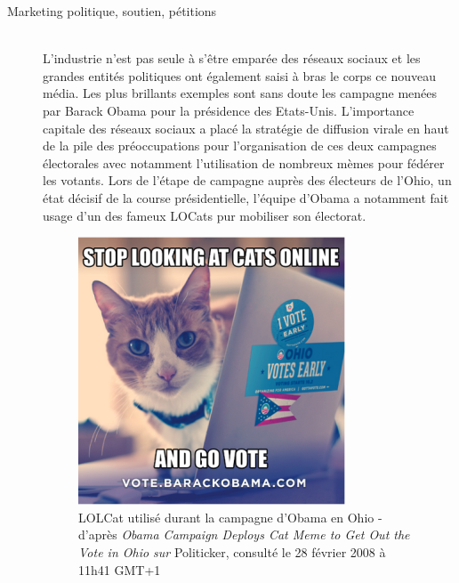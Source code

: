 \begin{description}
\item[Marketing politique, soutien, pétitions]
\hfill \\
L{\textquoteright}industrie n{\textquoteright}est pas seule à s{\textquoteright}être emparée des réseaux sociaux et les grandes entités politiques ont également saisi à bras le corps ce nouveau média. Les plus brillants exemples sont sans doute les campagne menées par Barack Obama pour la présidence des Etats-Unis. L{\textquoteright}importance capitale des réseaux sociaux a placé la stratégie de diffusion virale en haut de la pile des préoccupations pour l{\textquoteright}organisation de ces deux campagnes électorales \citep{Miller2008} avec notamment l{\textquoteright}utilisation de nombreux mèmes pour fédérer les votants. Lors de l{\textquoteright}étape de campagne auprès des électeurs de l{\textquoteright}Ohio, un état décisif de la course présidentielle, l{\textquoteright}équipe d{\textquoteright}Obama a notamment fait usage d{\textquoteright}un des fameux LOCats pur mobiliser son électorat. 


\begin{figure}[ht]
    \centering
    \includegraphics[scale=0.8]{figures/chap2/chapitre2-img16.png}
    \caption[Lolcat utilisé lors la campagne d'Obama]{ 
        LOLCat utilisé durant la campagne d{\textquoteright}Obama en Ohio - d{\textquoteright}après \textit{Obama Campaign Deploys Cat Meme to Get Out the Vote in Ohio sur }Politicker, consulté le 28 février 2008 à 11h41 GMT+1
    } 
    \label{fig:obama-cat}
\end{figure}


\end{description}
